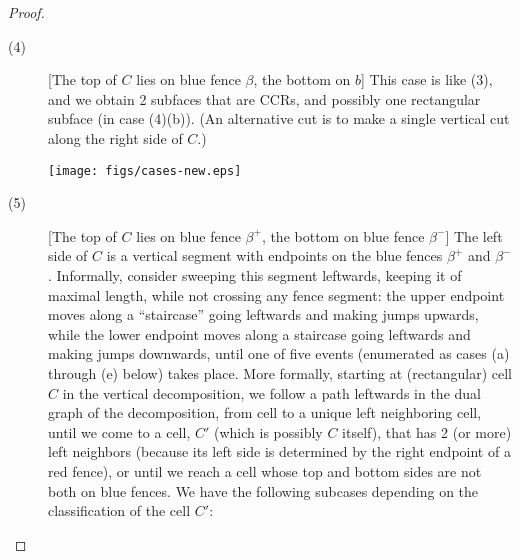 \documentclass{article}
\begin{document}
\begin{proof}
\begin{description}
    \item[(4)] [The top of $C$ lies on blue fence $\beta$, the bottom
      on $b$] This case is like (3), and we obtain 2 subfaces that are
      CCRs, and possibly one rectangular subface (in case (4)(b)). (An
      alternative cut is to make a single vertical cut along the right
      side of $C$.)


      \begin{figure*}[!htbp]
\centering \texttt{[image: figs/cases-new.eps]}
\caption{The cases in the proof of Lemma~\ref{lem:key}.  The
  rectangular cell $C$ is shown shaded gray; it is the cell of the
  vertical decomposition that contains $v'$, the slightly shifted (to
  the northwest) reflex vertex $v$ of $Q$, shown as a small black
  dot. Cuts are shown in thick green. The fences are shown in blue if their right
    endpoint lies on the right boundary (sides $r^+$ or $r$)
    of $Q$, and are referred to using the letter beta (``$\beta$, $\beta^-$, $\beta^+$'');
    fences with left endpoint on the left boundary (side $\ell$)
    of $Q$ are shown in red and are referred to
    using a letter alpha (``$\alpha$'').  Note that in cases (3) and (5) the blue fence segment is shown anchored at a point interior to the right side, $r$; it could be anchored at the top endpoint of $r$, or equivalently at the reflex vertex $v$.
    Only those fence segments that are needed to identify the subcases
    are shown; there may be numerous other red/blue fences.
}
\label{fig:cases-new}
\end{figure*}

    \item[(5)] [The top of $C$ lies on blue fence $\beta^+$, the
      bottom on blue fence $\beta^-$] The left side of $C$ is a
      vertical segment with endpoints on the blue fences $\beta^+$ and
      $\beta^-$.  Informally, consider sweeping this segment
      leftwards, keeping it of maximal length, while not crossing any
      fence segment: the upper endpoint moves along a ``staircase''
      going leftwards and making jumps upwards, while the lower
      endpoint moves along a staircase going leftwards and making
      jumps downwards, until one of five events (enumerated as cases
      (a) through (e) below) takes place. More formally, starting at
      (rectangular) cell $C$ in the vertical decomposition, we follow
      a path leftwards in the dual graph of the decomposition, from
      cell to a unique left neighboring cell, until we come to a cell,
      $C'$ (which is possibly $C$ itself), that has 2 (or more) left
      neighbors (because its left side is determined by the right
      endpoint of a red fence), or until we reach a cell whose top and
      bottom sides are not both on blue fences.
%
      We have the following subcases depending on the classification of the cell $C'$:


\end{description}
\end{proof}
\end{document}
